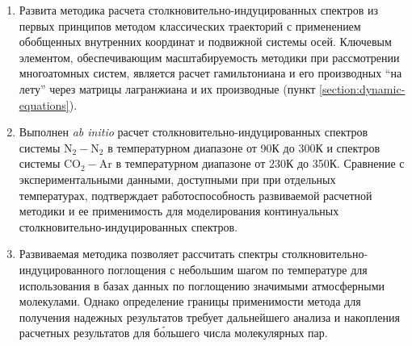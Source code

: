 \begin{enumerate}
    \item Развита методика расчета столкновительно-индуцированных спектров из первых принципов методом классических траекторий с применением обобщенных внутренних координат и подвижной системы осей. Ключевым элементом, обеспечивающим масштабируемость методики при рассмотрении многоатомных систем, является расчет гамильтониана и его производных \enquote{на лету} через матрицы лагранжиана и их производные (пункт \ref{section:dynamic-equations}).
    \item Выполнен \textit{ab initio} расчет столкновительно-индуцированных спектров системы N$_2-$N$_2$ в температурном диапазоне от 90К до 300К  и спектров системы CO$_2-$Ar в температурном диапазоне от 230К до 350К. Сравнение с экспериментальными данными, доступными при при отдельных температурах, подтверждает работоспособность развиваемой расчетной методики и ее применимость для моделирования континуальных столкновительно-индуцированных спектров.
    \item Развиваемая методика позволяет рассчитать спектры столкновительно-индуци\-рован\-ного поглощения с небольшим шагом по температуре для использования в базах данных по поглощению значимыми атмосферными молекулами. Однако определение границы применимости метода для получения надежных результатов требует дальнейшего анализа и накопления расчетных результатов для б\'{о}льшего числа молекулярных пар.  
\end{enumerate}
